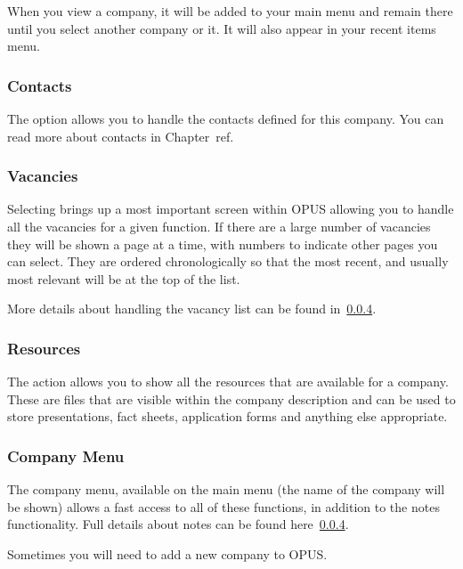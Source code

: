 \documentclass[12 pt]{book}
\begin{document}
When you view a company, it will be added to your main menu and remain there
until you select another company or  it. It will also appear
in your recent items menu.

\subsubsection{Contacts}

The  option allows you to handle the contacts defined for
this company. You can read more about contacts in Chapter~ref{}.

\subsubsection{Vacancies}

Selecting  brings up a most important screen within OPUS
allowing you to handle all the vacancies for a given function. If there are
a large number of vacancies they will be shown a page at a time, with numbers
to indicate other pages you can select. They are ordered chronologically so
that the most recent, and usually most relevant will be at the top of the
list.

More details about handling the vacancy list can be found in~\ref{}.

\subsubsection{Resources}

The  action allows you to show all the resources that are
available for a company. These are files that are visible within the company
description and can be used to store presentations, fact sheets, application
forms and anything else appropriate.

\subsubsection{Company Menu}

The company menu, available on the main menu (the name of the company will be
shown) allows a fast access to all of these functions, in addition to the notes
functionality. Full details about notes can be found here~\ref{}.

Sometimes you will need to add a new company to OPUS.
\end{document}
